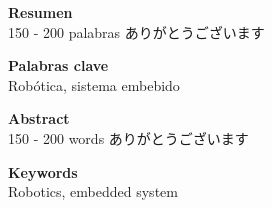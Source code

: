\textbf{{\Large Resumen}}\\

\label{Resumen}
150 - 200 palabras
ありがとうございます\cite{drenickAdaptiveServomechanisms1957}

\vspace{25mm}

\textbf{{\Large Palabras clave}}\\
\label{Palabras clave}
Robótica, sistema embebido

\vspace{50mm}

\textbf{{\Large Abstract}}\\
\label{Abstract}
150 - 200 words
ありがとうございます

\vspace{25mm}

\textbf{{\Large Keywords}}\\
\label{Keywords}
Robotics, embedded system